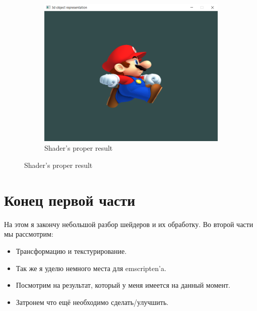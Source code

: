 \documentclass[12pt]{article}
\begin{document}
    \begin{figure}[!h]
        \centering
        \begin{subfigure}{.9\textwidth}
          \includegraphics[width=\linewidth]{images/shaders_result.png}
          \caption{Shader's proper result}
          \label{fig:sfig1}
        \end{subfigure}%
    \end{figure}
    \section{Конец первой части}
    На этом я закончу небольшой разбор шейдеров и их обработку.
    Во второй части мы рассмотрим:
    \begin{itemize}
        \item Трансформацию и текстурирование.
        \item Так же я уделю немного места для emscripten'a. 
        \item Посмотрим на результат, который у меня имеется на 
        данный момент.
        \item Затронем что ещё необходимо сделать/улучшить.
    \end{itemize}
    
\end{document}
